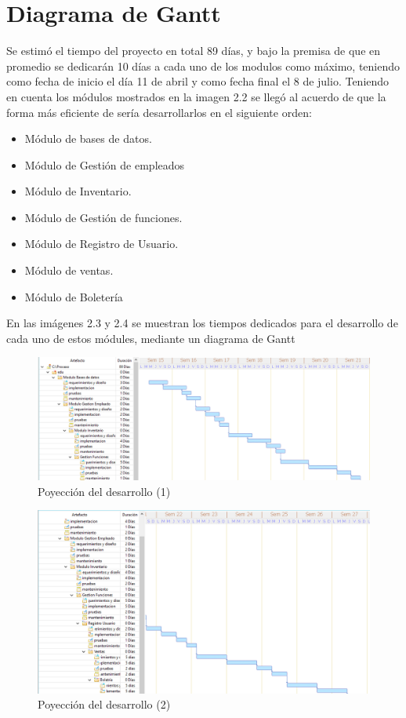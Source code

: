 \section{Diagrama de Gantt}
Se estimó el tiempo del proyecto en total 89 días, y bajo la premisa de que en promedio se dedicarán 10 días a cada uno de los modulos como máximo, teniendo como fecha de inicio el día 11 de abril y como fecha final el 8 de julio.
Teniendo en cuenta los módulos mostrados en la imagen 2.2 se llegó al acuerdo de que la forma más eficiente de sería desarrollarlos en el siguiente orden:
\begin{itemize}
	\item Módulo de bases de datos.
	\item Módulo de Gestión de empleados
	\item Módulo de Inventario.
	\item Módulo de Gestión de funciones.
	\item Módulo de Registro de Usuario.
	\item Módulo de ventas.
	\item Módulo de Boletería
\end{itemize}

En las imágenes 2.3 y 2.4 se muestran los tiempos dedicados para el desarrollo de cada uno de estos módules, mediante un diagrama de Gantt
\begin{figure}[h!]
	\centering
\includegraphics[width=1\linewidth]{proyecto/proceso/imgs/modulo1}
	\caption{Poyección del desarrollo (1)}
\end{figure}
\begin{figure}[h!]
	\centering
\includegraphics[width=0.9\linewidth]{proyecto/proceso/imgs/modulo2}
	\caption{Poyección del desarrollo (2)}
\end{figure}